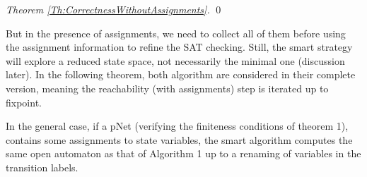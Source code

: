 \documentclass[smallcondensed]{svjour3}
\begin{document}
\begin{proof}[Theorem \ref{Th:CorrectnessWithoutAssignments}]
%	
%
%
\hfill\qed
\end{proof}

But in the presence of assignments, we need to collect all of them
  before using the assignment information to refine the SAT
  checking. Still, the smart strategy will explore a reduced state
  space, not necessarily the minimal one (discussion later). In the
  following theorem, both algorithm are considered in their complete
  version, meaning the reachability (with assignments) step is
  iterated up to fixpoint.
  
\begin{theorem}
  \label{Th:CorrectnessWithAssignments}
In the general case, if a pNet (verifying the finiteness conditions of theorem 1), contains some assignments to state variables, the smart algorithm computes 
the same open automaton as that of Algorithm 1 up to a renaming of variables in the transition labels.
\end{theorem}
\end{document}
